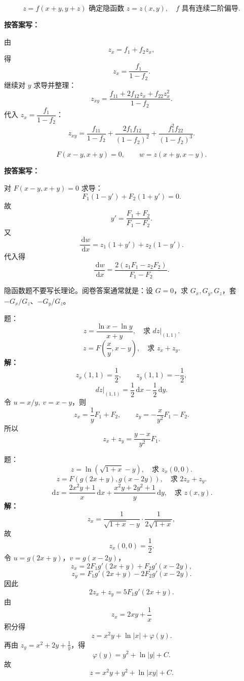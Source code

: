 \documentclass[11pt,a4paper,UTF8]{ctexart}
\newcommand{\dd}{\,\mathrm d}
\begin{document}
\begin{answerbox}[例 3：隐函数二阶偏导，2024--2025]
\[
z=f(x+y,y+z)\text{ 确定隐函数 }z=z(x,y),\quad f\text{ 具有连续二阶偏导}.
\]

\textbf{按答案写：}

由
\[
z_x=f_1+f_2z_x,
\]
得
\[
z_x=\frac{f_1}{1-f_2}.
\]
继续对 \(y\) 求导并整理：
\[
z_{xy}
=\frac{f_{11}+2f_{12}z_x+f_{22}z_x^2}{1-f_2}.
\]
代入 \(z_x=\dfrac{f_1}{1-f_2}\)：
\[
\boxed{
z_{xy}
=\frac{f_{11}}{1-f_2}
+\frac{2f_1f_{12}}{(1-f_2)^2}
+\frac{f_1^2f_{22}}{(1-f_2)^3}.
}
\]
\end{answerbox}

\begin{answerbox}[例 4：复合隐函数求导，2023--2024]
\[
F(x-y,x+y)=0,\qquad w=z(x+y,x-y).
\]

\textbf{按答案写：}

对 \(F(x-y,x+y)=0\) 求导：
\[
F_1(1-y')+F_2(1+y')=0.
\]
故
\[
y'=\frac{F_1+F_2}{F_1-F_2}.
\]
又
\[
\frac{\dd w}{\dd x}=z_1(1+y')+z_2(1-y').
\]
代入得
\[
\boxed{\frac{\dd w}{\dd x}
=\frac{2(z_1F_1-z_2F_2)}{F_1-F_2}.}
\]
\end{answerbox}

\begin{scorebox}[得分点]
隐函数题不要写长理论。阅卷答案通常就是：设 \(G=0\)，求 \(G_x,G_y,G_z\)，套 \(-G_x/G_z\)、\(-G_y/G_z\)。
\end{scorebox}

\newpage

\begin{answerbox}[2021--2022 简答 5 与计算 1]
题：
\[
z=\frac{\ln x-\ln y}{x+y},\quad \text{求 }dz\big|_{(1,1)}.
\]
\[
z=F\left(\frac xy,x-y\right),\quad \text{求 }z_x+z_y.
\]
\textbf{解：}
\[
z_x(1,1)=\frac12,\qquad z_y(1,1)=-\frac12,
\]
\[
\boxed{dz\big|_{(1,1)}=\frac12\dd x-\frac12\dd y}.
\]
令 \(u=x/y,\ v=x-y\)，则
\[
z_x=\frac1yF_1+F_2,\qquad
z_y=-\frac{x}{y^2}F_1-F_2.
\]
所以
\[
\boxed{z_x+z_y=\frac{y-x}{y^2}F_1}.
\]
\end{answerbox}

\begin{answerbox}[2022--2023 简答 5 与计算 1、2]
题：
\[
z=\ln(\sqrt{1+x}-y),\quad \text{求 }z_x(0,0).
\]
\[
z=F(g(2x+y),g(x-2y)),\quad \text{求 }2z_x+z_y.
\]
\[
\dd z=\frac{2x^2y+1}{x}\dd x+\frac{x^2y+2y^2+1}{y}\dd y,\quad \text{求 }z(x,y).
\]
\textbf{解：}
\[
z_x=\frac{1}{\sqrt{1+x}-y}\cdot\frac{1}{2\sqrt{1+x}},
\]
故
\[
\boxed{z_x(0,0)=\frac12}.
\]
令 \(u=g(2x+y)\)，\(v=g(x-2y)\)，
\[
z_x=2F_1g'(2x+y)+F_2g'(x-2y),
\]
\[
z_y=F_1g'(2x+y)-2F_2g'(x-2y).
\]
因此
\[
\boxed{2z_x+z_y=5F_1g'(2x+y)}.
\]
由
\[
z_x=2xy+\frac1x
\]
积分得
\[
z=x^2y+\ln|x|+\varphi(y).
\]
再由 \(z_y=x^2+2y+\frac1y\)，得
\[
\varphi(y)=y^2+\ln|y|+C.
\]
故
\[
\boxed{z=x^2y+y^2+\ln|xy|+C}.
\]
\end{answerbox}
\end{document}
